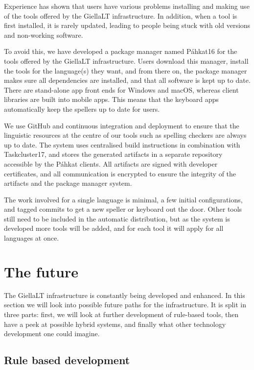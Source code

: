 \documentclass[free]{flammie}
\begin{document}
Experience has shown that users have various problems installing and making use of the
tools offered by the GiellaLT infrastructure. In addition, when a tool is first installed, it is
rarely updated, leading to people being stuck with old versions and non-working software.

To avoid this, we have developed a package manager named Páhkat16 for the tools offered by the GiellaLT infrastructure. Users download this manager, install the tools for the
language(s) they want, and from there on, the package manager makes sure all dependencies are installed, and that all software is kept up to date. There are stand-alone app front
ends for Windows and macOS, whereas client libraries are built into mobile apps. This
means that the keyboard apps automatically keep the spellers up to date for users.

We use GitHub and continuous integration and deployment to ensure that the linguistic
resources at the centre of our tools such as spelling checkers are always up to date. The
system uses centralised build instructions in combination with Taskcluster17, and stores the
generated artifacts in a separate repository accessible by the Páhkat clients. All artifacts are
signed with developer certificates, and all communication is encrypted to ensure the integrity of the artifacts and the package manager system.

The work involved for a single language is minimal, a few initial configurations, and
tagged commits to get a new speller or keyboard out the door. Other tools still need to be
included in the automatic distribution, but as the system is developed more tools will be
added, and for each tool it will apply for all languages at once.

\section{The future}

The GiellaLT infrastructure is constantly being developed and enhanced. In this section we
will look into possible future paths for the infrastructure. It is split in three parts: first, we
will look at further development of rule-based tools, then have a peek at possible hybrid
systems, and finally what other technology development one could imagine.

\subsection{Rule based development}
\end{document}
